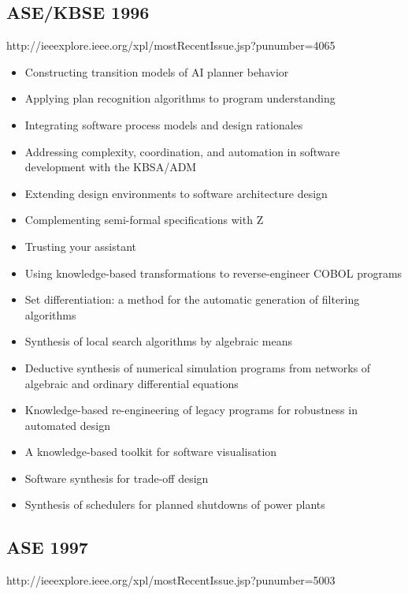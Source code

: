 \subsection{ASE/KBSE 1996}

http://ieeexplore.ieee.org/xpl/mostRecentIssue.jsp?punumber=4065

{\small
\begin{itemize}[itemsep=-1ex]
  \item Constructing transition models of AI planner behavior
  \item Applying plan recognition algorithms to program understanding
  \item Integrating software process models and design rationales
  \item Addressing complexity, coordination, and automation in software development with the KBSA/ADM
  \item Extending design environments to software architecture design
  \item Complementing semi-formal specifications with Z
  \item Trusting your assistant
  \item Using knowledge-based transformations to reverse-engineer COBOL programs
  \item Set differentiation: a method for the automatic generation of filtering algorithms
  \item Synthesis of local search algorithms by algebraic means
  \item Deductive synthesis of numerical simulation programs from networks of algebraic and ordinary differential equations
  \item Knowledge-based re-engineering of legacy programs for robustness in automated design
  \item A knowledge-based toolkit for software visualisation
  \item Software synthesis for trade-off design
  \item Synthesis of schedulers for planned shutdowns of power plants 
\end{itemize}
}

\subsection{ASE 1997}

http://ieeexplore.ieee.org/xpl/mostRecentIssue.jsp?punumber=5003

